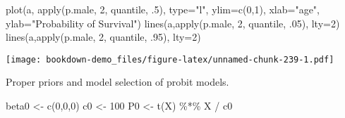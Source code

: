 \documentclass[
]{book}
\newenvironment{Shaded}{\begin{snugshade}}{\end{snugshade}}
\newcommand{\AttributeTok}[1]{\textcolor[rgb]{0.77,0.63,0.00}{#1}}
\newcommand{\DecValTok}[1]{\textcolor[rgb]{0.00,0.00,0.81}{#1}}
\newcommand{\FunctionTok}[1]{\textcolor[rgb]{0.00,0.00,0.00}{#1}}
\newcommand{\NormalTok}[1]{#1}
\newcommand{\OtherTok}[1]{\textcolor[rgb]{0.56,0.35,0.01}{#1}}
\newcommand{\SpecialCharTok}[1]{\textcolor[rgb]{0.00,0.00,0.00}{#1}}
\newcommand{\StringTok}[1]{\textcolor[rgb]{0.31,0.60,0.02}{#1}}
\begin{document}
\begin{Shaded}
\begin{Highlighting}[]
\FunctionTok{plot}\NormalTok{(a, }\FunctionTok{apply}\NormalTok{(p.male, }\DecValTok{2}\NormalTok{, quantile, .}\DecValTok{5}\NormalTok{), }
     \AttributeTok{type=}\StringTok{"l"}\NormalTok{, }\AttributeTok{ylim=}\FunctionTok{c}\NormalTok{(}\DecValTok{0}\NormalTok{,}\DecValTok{1}\NormalTok{),}
   \AttributeTok{xlab=}\StringTok{"age"}\NormalTok{, }\AttributeTok{ylab=}\StringTok{"Probability of Survival"}\NormalTok{)}
\FunctionTok{lines}\NormalTok{(a,}\FunctionTok{apply}\NormalTok{(p.male, }\DecValTok{2}\NormalTok{, quantile, .}\DecValTok{05}\NormalTok{), }\AttributeTok{lty=}\DecValTok{2}\NormalTok{)}
\FunctionTok{lines}\NormalTok{(a,}\FunctionTok{apply}\NormalTok{(p.male, }\DecValTok{2}\NormalTok{, quantile, .}\DecValTok{95}\NormalTok{), }\AttributeTok{lty=}\DecValTok{2}\NormalTok{)}
\end{Highlighting}
\end{Shaded}

\texttt{[image: bookdown-demo\_files/figure-latex/unnamed-chunk-239-1.pdf]}

Proper priors and model selection of probit models.

\begin{Shaded}
\end{Shaded}

\begin{Shaded}
\begin{Highlighting}[]
\NormalTok{beta0 }\OtherTok{\textless{}{-}} \FunctionTok{c}\NormalTok{(}\DecValTok{0}\NormalTok{,}\DecValTok{0}\NormalTok{,}\DecValTok{0}\NormalTok{)}
\NormalTok{c0 }\OtherTok{\textless{}{-}} \DecValTok{100}
\NormalTok{P0 }\OtherTok{\textless{}{-}} \FunctionTok{t}\NormalTok{(X) }\SpecialCharTok{\%*\%}\NormalTok{ X }\SpecialCharTok{/}\NormalTok{ c0}
\end{Highlighting}
\end{Shaded}

\begin{Shaded}
\end{Shaded}
\end{document}
